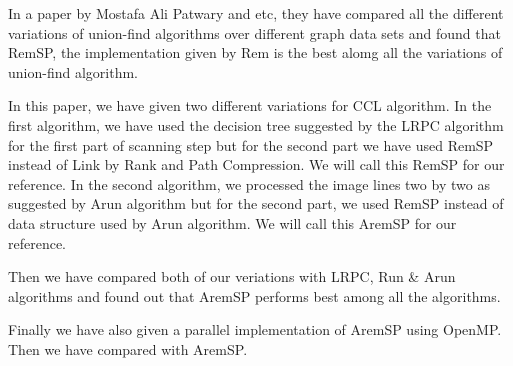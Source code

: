 In a paper by Mostafa Ali Patwary and etc, they have compared all the different variations of union-find algorithms
over different graph data sets and found that RemSP, the implementation given by Rem is the best alomg all the
variations of union-find algorithm.

In this paper, we have given two different variations for CCL algorithm. In the first algorithm, we have used the
decision tree suggested by the LRPC algorithm for the first part of scanning step but for the second part
we have used RemSP instead of Link by Rank and Path Compression. We will call this RemSP for our reference.
In the second algorithm, we processed the image lines two by two as suggested by Arun algorithm but for the
second part, we used RemSP instead of data structure used by Arun algorithm. We will call this AremSP for our reference.

Then we have compared both of our veriations with LRPC, Run & Arun algorithms and found out that AremSP performs best
among all the algorithms.

Finally we have also given a parallel implementation of AremSP using OpenMP. Then we have compared with AremSP.

